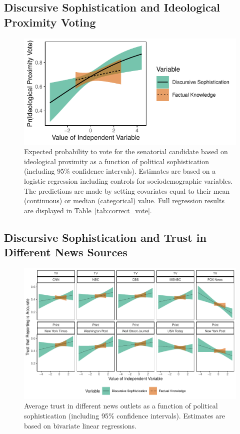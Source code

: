 \documentclass[12pt]{article}
\begin{document}
\clearpage
\subsection{Discursive Sophistication and Ideological Proximity Voting}\label{app:proximity}

\begin{figure}[h]\centering
	\includegraphics{../out/appC6-correct_vote.pdf}
	\caption{Expected probability to vote for the senatorial candidate based on ideological proximity as a function of political sophistication (including 95\% confidence intervals). Estimates are based on a logistic regression including controls for sociodemographic variables. The predictions are made by setting covariates equal to their mean (continuous) or median (categorical) value. Full regression results are displayed in Table~\ref{tab:correct_vote}.}\label{fig:correct_vote}
\end{figure}




\clearpage
\subsection{Discursive Sophistication and Trust in Different News Sources}\label{app:media}

\begin{figure}[h]\centering
	\includegraphics{../out/appC7-media_trust.pdf}
	\caption{Average trust in different news outlets as a function of political sophistication (including 95\% confidence intervals). Estimates are based on bivariate linear regressions.}\label{fig:media_trust}
\end{figure}
\end{document}
